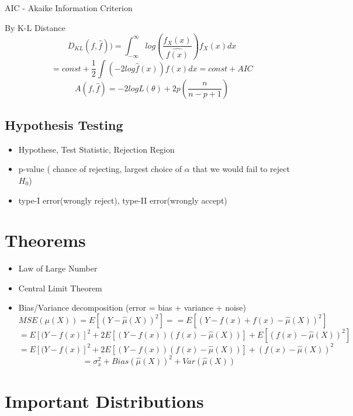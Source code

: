 \documentclass[11pt, openany]{book}              %
\begin{document}
AIC - Akaike Information Criterion

By K-L Distance
$$D_{KL}(f,\hat{f})) = \int_{-\infty}^{\infty} log(\frac{f_X(x)}{\hat{f(x)}})f_X(x)dx $$
$$ = const + \frac{1}{2} \int (-2log\hat{f}(x))f(x)dx = const + AIC $$
$$ A(f,\hat{f}) = -2 logL(\theta) + 2 p (\frac{n}{n-p+1})$$

\subsection{Hypothesis Testing}

\begin{itemize}
    \item Hypothese, Test Statistic, Rejection Region
    \item p-value ( chance of rejecting, largest choice of $\alpha$ that we would fail to reject $H_0$)   
    \item type-I error(wrongly reject), type-II error(wrongly accept)
\end{itemize}

\section{Theorems}

\begin{itemize}
    \item Law of Large Number
    \item Central Limit Theorem
        \item Bias/Variance decomposition (error = bias + variance + noise)
        $$MSE(\mu(X) ) = E[(Y-\hat{\mu}(X))^2]  = = E[(Y-f(x) + f(x) -\hat{\mu}(X))^2]$$
    $$= E[(Y-f(x)]^2 + 2E[(Y-f(x))(f(x) - \hat{\mu}(X))] + E[(f(x)-\hat{\mu}(X))^2]$$
     $$= E[(Y-f(x)]^2 + 2E[(Y-f(x))(f(x) - \hat{\mu}(X))] + (f(x)-\hat{\mu}(X))^2$$
    $$ =\sigma_x^2 + Bias(\hat{\mu}(X))^2 + Var(\hat{\mu}(X))$$
 
\end{itemize}

\section{Important Distributions}
\end{document}
